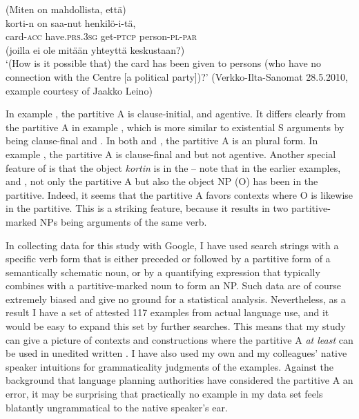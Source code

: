 \documentclass[output=paper]{LSP/langsci}
\begin{document}
\ea%
\label{15-hu-ex:10}
 (Miten on mahdollista, että)\\
\gll  korti-n on saa-nut henkilö-i-tä,\\
 card-\textsc{acc} have.\textsc{prs}.\textsc{3sg} get-\textsc{ptcp} person-\textsc{pl}-\textsc{par}\\
\glt (joilla ei ole mitään yhteyttä keskustaan?)\\
\glt  `(How is it possible that) the card has been given to persons (who have no connection with the Centre [a political party])?’ (Verkko-Ilta-Sanomat 28.5.2010, example courtesy of Jaakko Leino)
\z

In example , the partitive A is clause-initial,  and agentive. It differs clearly from the partitive A in example , which is more similar to existential S arguments by being clause-final and . In both  and , the partitive A is an  plural form. In example , the partitive A is clause-final and  but not agentive. Another special feature of  is that the object \textit{kortin} is in the  – note that in the earlier examples,  and , not only the partitive A but also the object NP (O) has been in the partitive. Indeed, it seems that the partitive A favors contexts where O is likewise in the partitive. This is a striking feature, because it results in two partitive-marked NPs being arguments of the same verb. 

In collecting data for this study with Google, I have used search strings with a specific verb form that is either preceded or followed by a partitive form of a semantically schematic noun, or by a quantifying expression that typically combines with a partitive-marked noun to form an NP. Such data are of course extremely biased and give no ground for a statistical analysis. Nevertheless, as a result I have a set of attested 117 examples from actual language use, and it would be easy to expand this set by further searches. This means that my study can give a picture of contexts and constructions where the partitive A \textit{at least} can be used in unedited written . I have also used my own and my colleagues’ native speaker intuitions for grammaticality judgments of the examples. Against the background that language planning authorities have considered the partitive A an error, it may be surprising that practically no example in my data set feels blatantly ungrammatical to the native speaker’s ear. 
\end{document}
